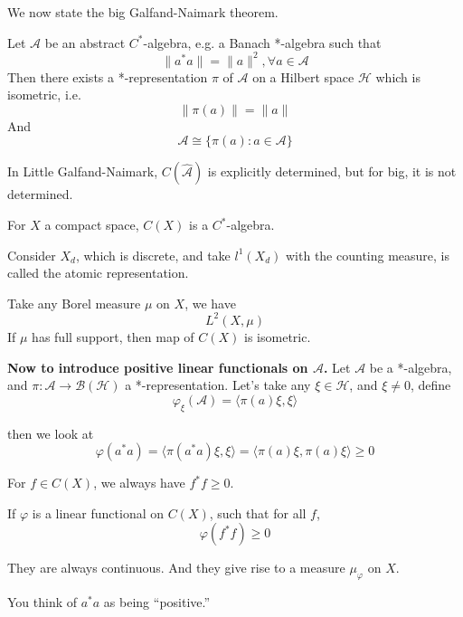 We now state the big Galfand-Naimark theorem.
\begin{theorem}
    Let $\mathcal{A}$ be an abstract $C^*$-algebra, e.g. a Banach *-algebra such that 
    \begin{equation*}
        \|a^*a\|=\|a\|^2, \forall a\in\mathcal{A}
    \end{equation*}
    Then there exists a *-representation $\pi$ of $\mathcal{A}$ on a Hilbert space $\mathcal{H}$ which is isometric, i.e.
    \begin{equation*}
        \|\pi(a)\|=\|a\|
    \end{equation*}
    And
    \begin{equation*}
        \mathcal{A}\cong \{\pi(a): a\in\mathcal{A}\}
    \end{equation*}
\end{theorem}
\begin{note}
    In Little Galfand-Naimark, $C(\widehat{\mathcal{A}})$ is explicitly determined, but for big, it is not determined.
\end{note}

For $X$ a compact space, $C(X)$ is a $C^*$-algebra.

Consider $X_d$, which is discrete, and take $l^1(X_d)$ with the counting measure, is called the atomic representation.

Take any Borel measure $\mu$ on $X$, we have
\begin{equation*}
    L^2(X,\mu)
\end{equation*}
If $\mu$ has full support, then map of $C(X)$ is isometric.

\textbf{Now to introduce positive linear functionals on $\mathcal{A}$.}
Let $\mathcal{A}$ be a *-algebra, and $\pi:\mathcal{A}\to\mathcal{B}(\mathcal{H})$ a *-representation. Let's take any $\xi\in\mathcal{H}$, and $\xi\neq 0$, define
\begin{equation*}
    \varphi_\xi(\mathcal{A})=\langle \pi(a)\xi, \xi\rangle 
\end{equation*}

then we look at 
\begin{equation*}
    \varphi(a^*a)=\langle\pi(a^*a)\xi, \xi\rangle=\langle \pi(a)\xi, \pi(a)\xi\rangle\geq 0
\end{equation*}
\begin{note}
    For $f\in C(X)$, we always have $f^*f\geq 0$.
\end{note}
\begin{definition}
    If $\varphi$ is a linear functional on $C(X)$, such that for all $f$,
    \begin{equation*}
        \varphi(f^*f)\geq 0
    \end{equation*}
\end{definition}
\begin{remark}
    They are always continuous. And they give rise to a measure $\mu_\varphi$ on $X$.
\end{remark}
You think of $a^*a$ as being ``positive.''

